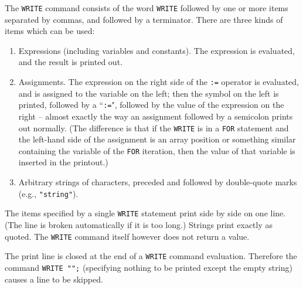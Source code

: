 The {\tt WRITE} command consists of the word {\tt WRITE} followed by one
or more items separated by commas, and followed by a terminator.  There
are three kinds of items which can be used:
\begin{enumerate}
\item Expressions (including variables and constants).  The expression is
evaluated, and the result is printed out.

\item Assignments.  The expression on the right side of the {\tt :=}
operator is evaluated, and is assigned to the variable on the left; then
the symbol on the left is printed, followed by a ``{\tt :=}", followed by
the value of the expression on the right -- almost exactly the way an
assignment followed by a semicolon prints out normally. (The difference is
that if the {\tt WRITE} is in a {\tt FOR} statement and the left-hand side
of the assignment is an array position or something similar containing the
variable of the {\tt FOR} iteration, then the value of that variable is
inserted in the printout.)

\item Arbitrary strings of characters, preceded and followed by double-quote
marks (e.g., {\tt "string"}).
\end{enumerate}
The items specified by a single {\tt WRITE} statement print side by side
on one line. (The line is broken automatically if it is too long.) Strings
print exactly as quoted.  The {\tt WRITE} command itself however does not
return a value.

The print line is closed at the end of a {\tt WRITE} command evaluation.
Therefore the command {\tt WRITE "";} (specifying nothing to be printed
except the empty string) causes a line to be skipped.

